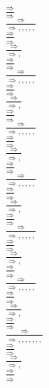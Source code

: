 \documentclass[11pt]{article}
\begin{document}
\begin{center}
\\$\frac{\Rightarrow }{\Rightarrow }$
\bigskip
\\$\frac{\Rightarrow }{\Rightarrow , , , , , }$
\bigskip
\\$\frac{\Rightarrow }{\Rightarrow }$
\bigskip
\\$\frac{\Rightarrow }{\Rightarrow , }$
\bigskip
\\$\frac{\Rightarrow }{\Rightarrow }$
\bigskip
\\$\frac{\Rightarrow }{\Rightarrow , , , , , }$
\bigskip
\\$\frac{\Rightarrow }{\Rightarrow }$
\bigskip
\\$\frac{\Rightarrow }{\Rightarrow , }$
\bigskip
\\$\frac{\Rightarrow }{\Rightarrow }$
\bigskip
\\$\frac{\Rightarrow }{\Rightarrow , , , , , }$
\bigskip
\\$\frac{\Rightarrow }{\Rightarrow }$
\bigskip
\\$\frac{\Rightarrow }{\Rightarrow , }$
\bigskip
\\$\frac{\Rightarrow }{\Rightarrow }$
\bigskip
\\$\frac{\Rightarrow }{\Rightarrow , , , , , }$
\bigskip
\\$\frac{\Rightarrow }{\Rightarrow }$
\bigskip
\\$\frac{\Rightarrow }{\Rightarrow , }$
\bigskip
\\$\frac{\Rightarrow }{\Rightarrow }$
\bigskip
\\$\frac{\Rightarrow }{\Rightarrow , , , , , }$
\bigskip
\\$\frac{\Rightarrow }{\Rightarrow }$
\bigskip
\\$\frac{\Rightarrow }{\Rightarrow , }$
\bigskip
\\$\frac{\Rightarrow }{\Rightarrow }$
\bigskip
\\$\frac{\Rightarrow }{\Rightarrow , , , , , }$
\bigskip
\\$\frac{\Rightarrow }{\Rightarrow }$
\bigskip
\\$\frac{\Rightarrow }{\Rightarrow , }$
\bigskip
\\$\frac{\Rightarrow }{\Rightarrow }$
\bigskip
\\$\frac{\Rightarrow }{\Rightarrow , , , , , , , }$
\bigskip
\\$\frac{\Rightarrow }{\Rightarrow }$
\bigskip
\\$\frac{\Rightarrow }{\Rightarrow , }$
\bigskip
\\$\frac{\Rightarrow }{\Rightarrow }$

\end{center}
\end{document}
